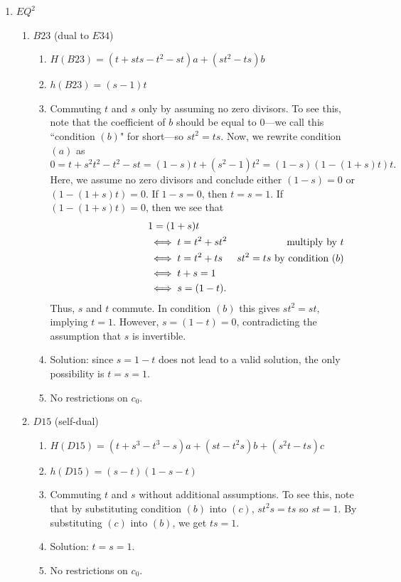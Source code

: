 \documentclass[11pt]{amsart}
\theoremstyle{definition}
\begin{document}
\begin{enumerate}
\item[(8)] $EQ^2$
        \begin{enumerate}
            \item \textbf{$B23$} (dual to $E34$)
            \begin{enumerate}
                \item $H(B23) = (t+sts-t^2-st)a+(st^2-ts)b$
                \item $h(B23) = (s-1)t$
                \item Commuting $t$ and $s$ only by assuming no zero divisors. To see this, note that the coefficient of $b$ should be equal to $0$---we call this ``condition $(b)$" for short---so  $st^2 =ts$. Now, we rewrite condition $(a)$ as $0=t+s^2t^2-t^2-st = (1-s)t+(s^2-1)t^2= (1-s)(1-(1+s)t)t.$ Here, we assume no zero divisors and conclude either $(1-s)=0$ or $(1-(1+s)t)=0$. If $1-s=0$, then $t=s=1$. If $(1-(1+s)t)=0$, then we see that 
                \begin{align*}
                  \hspace{3 cm}  &  1 = (1+s)t \\
                    & \iff t = t^2+st^2  & \text{multiply by $t$}\\
                    & \iff t = t^2 + ts & \text{$st^2=ts$ by condition $(b)$} \\
                    & \iff t+s=1 \\
                    & \iff s=(1-t). 
                \end{align*}
                Thus, $s$ and $t$ commute. In condition $(b)$ this gives $st^2 = st$, implying $t = 1$. However, $s = (1 - t) = 0$, contradicting the assumption that $s$ is invertible. 
                \item Solution: since $s = 1 - t$ does not lead to a valid solution, the only possibility is $t=s=1$.
                \item No restrictions on $c_0$.
            \end{enumerate}
                
        \item $D15$ (self-dual)
            \begin{enumerate}
                \item  $H(D15) = (t+s^3-t^3-s)a + (st-t^2s)b +(s^2t-ts)c $
                \item $h(D15)=(s-t)(1-s-t)$ 
                \item Commuting $t$ and $s$ without additional assumptions. To see this, note that by substituting condition $(b)$ into $(c)$, $st^2s=ts$ so $st=1$. By substituting $(c)$ into $(b)$, we get $ts=1$.
                \item Solution: $t=s=1$. 
                \item No restrictions on $c_0$.
            \end{enumerate}
            

\end{enumerate}
\end{enumerate}
\end{document}
